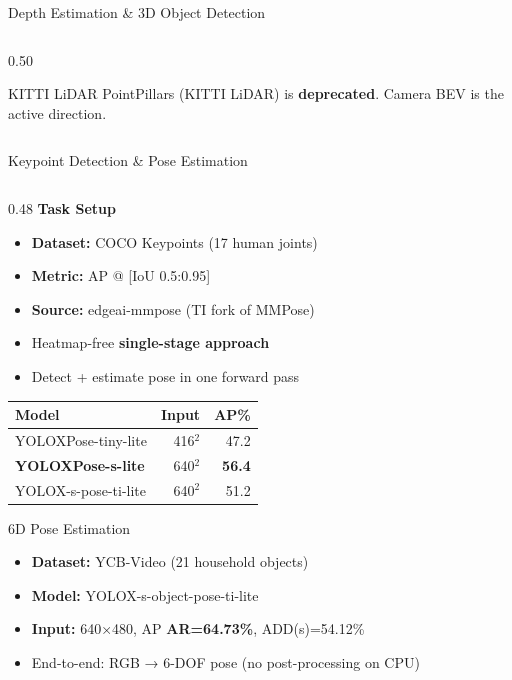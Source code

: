 \documentclass[aspectratio=169,12pt]{beamer}
\begin{document}
\begin{frame}{Depth Estimation \& 3D Object Detection}
\begin{columns}[T]
\begin{column}{0.50\textwidth}
      \vspace{0.2cm}
      \begin{alertblock}{\scriptsize KITTI LiDAR}
        \scriptsize PointPillars (KITTI LiDAR) is \textbf{deprecated}.
        Camera BEV is the active direction.
      \end{alertblock}
    \end{column}
  \end{columns}
\end{frame}

\begin{frame}{Keypoint Detection \& Pose Estimation}
  \begin{columns}[T]
    \begin{column}{0.48\textwidth}
      \textbf{Task Setup}
      \begin{itemize}\footnotesize
        \item \textbf{Dataset:} COCO Keypoints (17 human joints)
        \item \textbf{Metric:} AP @ [IoU 0.5:0.95]
        \item \textbf{Source:} edgeai-mmpose (TI fork of MMPose)
        \item Heatmap-free \textbf{single-stage approach}
        \item Detect + estimate pose in one forward pass
      \end{itemize}

      \vspace{0.3cm}
      \begin{tabular}{lrr}
        \toprule
        \textbf{Model} & \textbf{Input} & \textbf{AP\%} \\
        \midrule
        \rowcolor{TIGray} YOLOXPose-tiny-lite & 416$^2$ & 47.2 \\
        \textbf{YOLOXPose-s-lite} & 640$^2$ & \textbf{56.4} \\
        \rowcolor{TIGray} YOLOX-s-pose-ti-lite & 640$^2$ & 51.2 \\
        \bottomrule
      \end{tabular}

      \vspace{0.3cm}
      \begin{block}{6D Pose Estimation}
        \begin{itemize}\scriptsize
          \item \textbf{Dataset:} YCB-Video (21 household objects)
          \item \textbf{Model:} YOLOX-s-object-pose-ti-lite
          \item \textbf{Input:} 640×480, AP \textbf{AR=64.73\%}, ADD(s)=54.12\%
          \item End-to-end: RGB → 6-DOF pose (no post-processing on CPU)
        \end{itemize}
      \end{block}
    \end{column}


\end{columns}
\end{frame}
\end{document}
